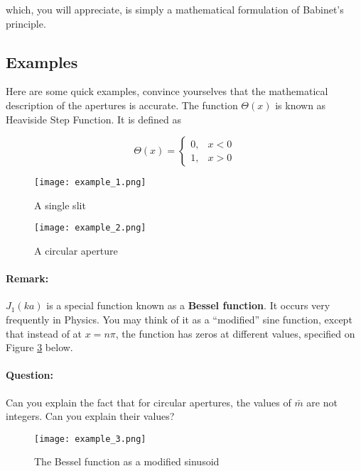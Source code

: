 which, you will appreciate, is simply a mathematical formulation of Babinet's principle.

\subsection{Examples}

Here are some quick examples, convince yourselves that the mathematical description of the apertures is accurate. The function $\Theta(x)$ is known as Heaviside Step Function. It is defined as

\begin{equation*}
\Theta (x) = \begin{cases}
              0, & x < 0\\
              1, & x > 0
             \end{cases}
\end{equation*}


\begin{figure}[!htb]
\centering
\texttt{[image: example\_1.png]}
\caption{A single slit}
\label{example_1}
\end{figure}

\begin{figure}[!htb]
\centering
\texttt{[image: example\_2.png]}
\caption{A circular aperture}
\label{example_2}
\end{figure}


\begin{tcolorbox}
\paragraph{Remark: } $J_1(ka)$ is a special function known as a \textbf{Bessel function}. It occurs very frequently in Physics. You may think of it as a ``modified'' sine function, except that instead of at $x=n\pi$, the function has zeros at different values, specified on Figure \ref{example_3} below.

\paragraph{Question: } Can you explain the fact that for circular apertures, the values of $\bar{m}$ are not integers. Can you explain their values?
\end{tcolorbox}

\begin{figure}[!htb]
\centering
\texttt{[image: example\_3.png]}
\caption{The Bessel function as a modified sinusoid}
\label{example_3}
\end{figure}

